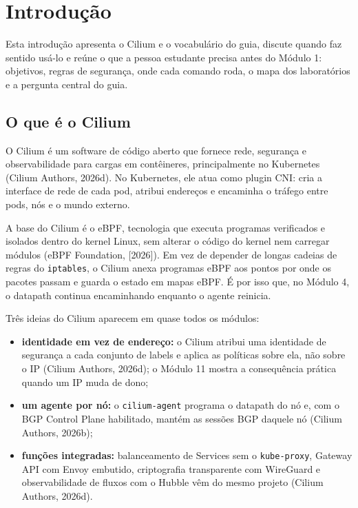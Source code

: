 \documentclass[12pt,openany,oneside,a4paper,chapter=TITLE,english,brazil]{abntex2}
\providecommand{\tightlist}{\setlength{\itemsep}{0pt}\setlength{\parskip}{0pt}}
\newcommand{\listofquadrosname}{Lista de quadros}
\begin{document}
\listoffigures*
\cleardoublepage
\pdfbookmark[0]{\listofquadrosname}{loq}
\listofquadros*
\cleardoublepage
{}
\listoftables*
\cleardoublepage
{}
\tableofcontents*
\cleardoublepage

\textual
\OnehalfSpacing

\chapter*{Introdução}

Esta introdução apresenta o Cilium e o vocabulário do guia, discute quando faz
sentido usá-lo e reúne o que a pessoa estudante precisa antes do Módulo 1:
objetivos, regras de segurança, onde cada comando roda, o mapa dos
laboratórios e a pergunta central do guia.

\section*{O que é o Cilium}\label{o-que-uxe9-o-cilium}

O Cilium é um software de código aberto que fornece rede, segurança e
observabilidade para cargas em contêineres, principalmente no Kubernetes
(Cilium Authors, 2026d). No Kubernetes, ele atua como plugin CNI: cria a
interface de rede de cada pod, atribui endereços e encaminha o tráfego entre
pods, nós e o mundo externo.

A base do Cilium é o eBPF, tecnologia que executa programas verificados e
isolados dentro do kernel Linux, sem alterar o código do kernel nem carregar
módulos (eBPF Foundation, {[}2026{]}). Em vez de depender de longas cadeias de
regras do \texttt{iptables}, o Cilium anexa programas eBPF aos pontos por onde os
pacotes passam e guarda o estado em mapas eBPF. É por isso que, no Módulo 4, o
datapath continua encaminhando enquanto o agente reinicia.

Três ideias do Cilium aparecem em quase todos os módulos:

\begin{itemize}
\tightlist
\item
  \textbf{identidade em vez de endereço:} o Cilium atribui uma identidade de segurança a cada conjunto de labels e aplica as políticas sobre ela, não sobre o IP (Cilium Authors, 2026d); o Módulo 11 mostra a consequência prática quando um IP muda de dono;
\item
  \textbf{um agente por nó:} o \texttt{cilium-{}\allowbreak{}agent} programa o datapath do nó e, com o BGP Control Plane habilitado, mantém as sessões BGP daquele nó (Cilium Authors, 2026b);
\item
  \textbf{funções integradas:} balanceamento de Services sem o \texttt{kube-{}\allowbreak{}proxy}, Gateway API com Envoy embutido, criptografia transparente com WireGuard e observabilidade de fluxos com o Hubble vêm do mesmo projeto (Cilium Authors, 2026d).
\end{itemize}
\end{document}
